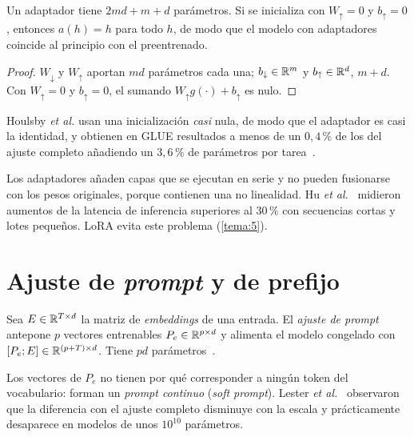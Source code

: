 \begin{proposicion}\label{prop:adaptador}
Un adaptador tiene $2md+m+d$ parámetros. Si se inicializa con $W_{\uparrow}=0$ y $b_{\uparrow}=0$, entonces $a(h)=h$ para todo $h$, de modo que el modelo con adaptadores coincide al principio con el preentrenado.
\end{proposicion}

\begin{proof}
$W_{\downarrow}$ y $W_{\uparrow}$ aportan $md$ parámetros cada una; $b_{\downarrow}\in\mathbb{R}^{m}$ y $b_{\uparrow}\in\mathbb{R}^{d}$, $m+d$. Con $W_{\uparrow}=0$ y $b_{\uparrow}=0$, el sumando $W_{\uparrow}g(\cdot)+b_{\uparrow}$ es nulo.
\end{proof}

Houlsby \emph{et al.} usan una inicialización \emph{casi} nula, de modo que el adaptador es casi la identidad, y obtienen en GLUE resultados a menos de un $0{,}4\,\%$ de los del ajuste completo añadiendo un $3{,}6\,\%$ de parámetros por tarea~\cite{houlsby}.

\begin{observacion}[Latencia]
Los adaptadores añaden capas que se ejecutan en serie y no pueden fusionarse con los pesos originales, porque contienen una no linealidad. Hu \emph{et al.}~\cite[§3]{hu-lora} midieron aumentos de la latencia de inferencia superiores al $30\,\%$ con secuencias cortas y lotes pequeños. LoRA evita este problema (\cref{tema:5}).
\end{observacion}

\section{Ajuste de \emph{prompt} y de prefijo}

\begin{definicion}\label{def:prompt-tuning}
Sea $E\in\mathbb{R}^{T\times d}$ la matriz de \emph{embeddings} de una entrada. El \emph{ajuste de prompt} antepone $p$ vectores entrenables $P_e\in\mathbb{R}^{p\times d}$ y alimenta el modelo congelado con $[P_e;E]\in\mathbb{R}^{(p+T)\times d}$. Tiene $pd$ parámetros~\cite{lester}.
\end{definicion}

Los vectores de $P_e$ no tienen por qué corresponder a ningún token del vocabulario: forman un \emph{prompt continuo} (\emph{soft prompt}). Lester \emph{et al.}~\cite{lester} observaron que la diferencia con el ajuste completo disminuye con la escala y prácticamente desaparece en modelos de unos $10^{10}$ parámetros.

